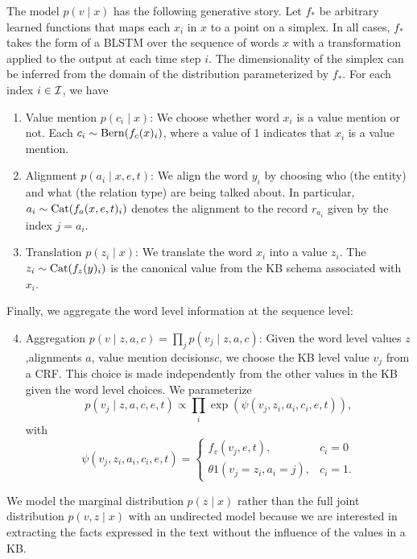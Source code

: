 \documentclass[12pt]{article}
\begin{document}
The model $p(v\mid x)$ has the following generative story.
Let $f_*$ be arbitrary learned functions that maps each $x_i$ in $x$ to
a point on a simplex.
In all cases, $f_*$ takes the form of a BLSTM over the sequence of words $x$
with a transformation applied to the output at each time step $i$.
The dimensionality of the simplex can be inferred from the domain of the
distribution parameterized by $f_*$.
For each index $i \in \mathcal{I}$, we have
\begin{enumerate}
\item Value mention $p(c_i \mid x)$: We choose whether word $x_i$
   is a value mention or not. Each $c_i \sim \mathrm{Bern}(f_c(x)_i)$, where a value of 1 indicates
   that $x_i$ is a value mention.
\item Alignment $p(a_i \mid x,e,t)$: We align the word $y_i$ by choosing who (the entity)
    and what (the relation type) are being talked about.
    In particular, $a_i\sim\mathrm{Cat}(f_a(x,e,t)_i)$ denotes the alignment to the record $r_{a_i}$
    given by the index $j = a_i$. 
\item Translation $p(z_i \mid x)$: We translate the word $x_i$ into a value $z_i$.
    The $z_i \sim \mathrm{Cat}(f_z(y)_i)$ is the canonical value from the KB schema 
    associated with $x_i$.
\end{enumerate}

Finally, we aggregate the word level information at the sequence level:
\begin{enumerate}
\setcounter{enumi}{3}
\item Aggregation $p(v \mid z,a,c) = \prod_j p(v_j \mid z,a,c)$:
    Given the word level values $z$,alignments $a$, value mention decisions$c$,
    we choose the KB level value $v_j$ from a CRF.
    This choice is made independently from the other values in the KB
    given the word level choices.
    We parameterize
    $$p(v_j \mid z,a,c,e,t) \propto \prod_i \exp(\psi(v_j, z_i, a_i, c_i,e,t)),$$
    with
    $$
    \psi(v_j, z_i, a_i, c_i,e,t) = \begin{cases}
    f_v(v_j,e,t), & c_i = 0 \\
    \theta 1(v_j = z_i, a_i = j), & c_i = 1.
    \end{cases}
    $$
\end{enumerate}

We model the marginal distribution $p(z \mid x)$ rather than
the full joint distribution $p(v,z\mid x)$ with an undirected model
because we are interested in extracting the facts expressed in the text
without the influence of the values in a KB.
\end{document}
